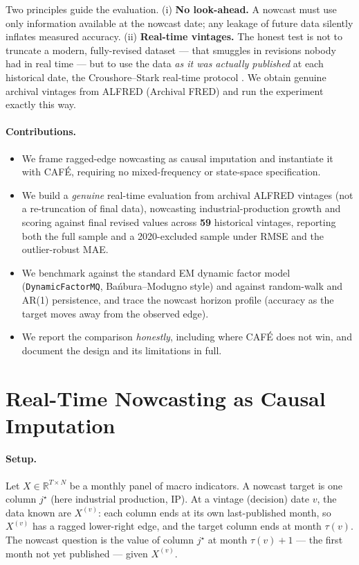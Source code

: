 \documentclass[11pt]{article}
\newcommand{\cafe}{CAF\'E}
\begin{document}
Two principles guide the evaluation. (i) \textbf{No look-ahead.} A nowcast must use only
information available at the nowcast date; any leakage of future data silently inflates
measured accuracy. (ii) \textbf{Real-time vintages.} The honest test is not to truncate a
modern, fully-revised dataset --- that smuggles in revisions nobody had in real time ---
but to use the data \emph{as it was actually published} at each historical date, the
Croushore--Stark real-time protocol \cite{croushore2001realtime}. We obtain genuine
archival vintages from ALFRED (Archival FRED) and run the experiment exactly this way.

\paragraph{Contributions.}
\begin{itemize}
\item We frame ragged-edge nowcasting as causal imputation and instantiate it with
\cafe{}, requiring no mixed-frequency or state-space specification.
\item We build a \emph{genuine} real-time evaluation from archival ALFRED vintages
(not a re-truncation of final data), nowcasting industrial-production growth and scoring
against final revised values across \textbf{59} historical vintages, reporting both
the full sample and a 2020-excluded sample under RMSE and the outlier-robust MAE.
\item We benchmark against the standard EM dynamic factor model (\texttt{DynamicFactorMQ},
Ba\'nbura--Modugno style) and against random-walk and AR(1) persistence, and trace the
nowcast horizon profile (accuracy as the target moves away from the observed edge).
\item We report the comparison \emph{honestly}, including where \cafe{} does not win, and
document the design and its limitations in full.
\end{itemize}

\section{Real-Time Nowcasting as Causal Imputation}
\paragraph{Setup.} Let $X\in\mathbb{R}^{T\times N}$ be a monthly panel of macro
indicators. A nowcast target is one column $j^\star$ (here industrial production, IP). At
a vintage (decision) date $v$, the data known are $X^{(v)}$: each column ends at its own
last-published month, so $X^{(v)}$ has a ragged lower-right edge, and the target column
ends at month $\tau(v)$. The nowcast question is the value of column $j^\star$ at month
$\tau(v)+1$ --- the first month not yet published --- given $X^{(v)}$.
\end{document}
